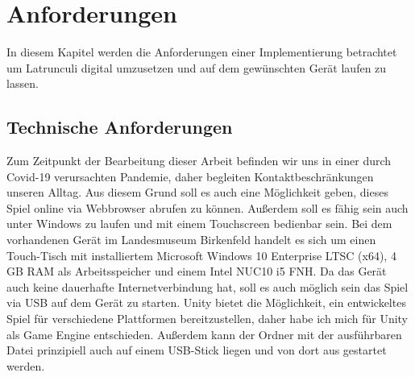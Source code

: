
\chapter{Anforderungen}
\label{ch:Analyse}
In diesem Kapitel werden die Anforderungen einer Implementierung betrachtet um Latrunculi digital umzusetzen und auf dem gewünschten Gerät laufen zu lassen.


\section{Technische Anforderungen}
\label{ch:Analyse:sec:TechAnforderungen}
Zum Zeitpunkt der Bearbeitung dieser Arbeit befinden wir uns in einer durch Covid-19 verursachten Pandemie, daher begleiten Kontaktbeschränkungen unseren Alltag. Aus diesem Grund soll es auch eine Möglichkeit geben, dieses Spiel online via Webbrowser abrufen zu können. Außerdem soll es fähig sein auch unter Windows zu laufen und mit einem Touchscreen bedienbar sein. Bei dem vorhandenen Gerät im Landesmuseum Birkenfeld handelt es sich um einen Touch-Tisch mit installiertem Microsoft Windows 10 Enterprise LTSC (x64), 4 GB RAM als Arbeitsspeicher und einem Intel NUC10 i5 FNH. Da das Gerät auch keine dauerhafte Internetverbindung hat, soll es auch möglich sein das Spiel via USB auf dem Gerät zu starten. Unity bietet die Möglichkeit, ein entwickeltes Spiel für verschiedene Plattformen bereitzustellen, daher habe ich mich für Unity als Game Engine entschieden. Außerdem kann der Ordner mit der ausführbaren Datei prinzipiell auch auf einem USB-Stick liegen und von dort aus gestartet werden.

